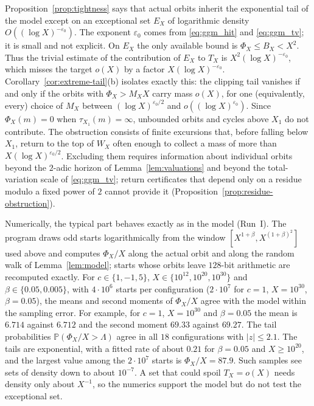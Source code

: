 \begin{remark}
\label{rem:tail-barrier}
Proposition~\ref{prop:tightness} says that actual orbits inherit the
exponential tail of the model except on an exceptional set $E_X$ of
logarithmic density $O((\log X)^{-\varepsilon_0})$. The exponent
$\varepsilon_0$ comes from \eqref{eq:ggm_hit} and \eqref{eq:ggm_tv}; it
is small and not explicit. On $E_X$ the only available bound is
$\Phi_X\le B_X<X^2$. Thus the trivial estimate of the contribution of
$E_X$ to $T_X$ is $X^2(\log X)^{-\varepsilon_0}$, which misses the
target $o(X)$ by a factor $X(\log X)^{-\varepsilon_0}$.
Corollary~\ref{cor:extreme-tail}(b) isolates exactly this: the clipping
tail vanishes if and only if the orbits with $\Phi_X>M_XX$ carry mass
$o(X)$, for one (equivalently, every) choice of $M_X$ between
$(\log X)^{\varepsilon_0/2}$ and $o((\log X)^{\varepsilon_0})$.
Since $\Phi_X(m)=0$ when $\tau_{X_1}(m)=\infty$, unbounded orbits and
cycles above $X_1$ do not contribute. The obstruction consists of
finite excursions that, before falling below $X_1$, return to the top
of $W_X$ often enough to collect a mass of more than
$X(\log X)^{\varepsilon_0/2}$.
Excluding them requires information about individual orbits beyond the
$2$-adic horizon of Lemma~\ref{lem:valuations} and beyond the
total-variation scale of \eqref{eq:ggm_tv}; return certificates that
depend only on a residue modulo a fixed power of $2$ cannot provide it
(Proposition~\ref{prop:residue-obstruction}).

Numerically, the typical part behaves exactly as in the model (Run~I).
The program  draws odd starts logarithmically from the
window $[X^{1+\beta},X^{(1+\beta)^2}]$ used above and computes
$\Phi_X/X$ along the actual orbit and along the random walk of
Lemma~\ref{lem:model}; starts whose orbits leave $128$-bit arithmetic
are recomputed exactly. For $c\in\{1,-1,5\}$,
$X\in\{10^{12},10^{20},10^{30}\}$ and $\beta\in\{0.05,0.005\}$, with
$4\cdot10^6$ starts per configuration ($2\cdot10^7$ for $c=1$,
$X=10^{30}$, $\beta=0.05$), the means and second moments of $\Phi_X/X$
agree with the model within the sampling error. For example, for $c=1$,
$X=10^{30}$ and $\beta=0.05$ the mean is $6.714$ against $6.712$ and the
second moment $69.33$ against $69.27$. The tail probabilities
$\mathbb P(\Phi_X/X>\Lambda)$ agree in all $18$ configurations with
$|z|\le2.1$. The tails are exponential, with a fitted rate of about
$0.21$ for $\beta=0.05$ and $X\ge10^{20}$, and the largest value among
the $2\cdot10^7$ starts is $\Phi_X/X=87.9$. Such samples see sets of
density down to about $10^{-7}$. A set that could spoil $T_X=o(X)$ needs
density only about $X^{-1}$, so the numerics support the model but do
not test the exceptional set.
\end{remark}
